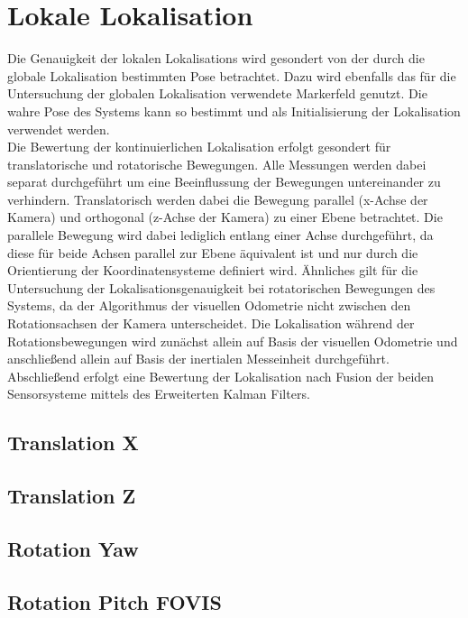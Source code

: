 \section{Lokale Lokalisation}%
Die Genauigkeit der lokalen Lokalisations wird gesondert von der durch die globale Lokalisation bestimmten Pose betrachtet. Dazu wird ebenfalls das für die Untersuchung der globalen Lokalisation verwendete Markerfeld genutzt. Die wahre Pose des Systems kann so bestimmt und als Initialisierung der Lokalisation verwendet werden.\\
Die Bewertung der kontinuierlichen Lokalisation erfolgt gesondert für translatorische und rotatorische Bewegungen. Alle Messungen werden dabei separat durchgeführt um eine Beeinflussung der Bewegungen untereinander zu verhindern. Translatorisch werden dabei die Bewegung parallel (x-Achse der Kamera) und orthogonal (z-Achse der Kamera) zu einer Ebene betrachtet. Die parallele Bewegung wird dabei lediglich entlang einer Achse durchgeführt, da diese für beide Achsen parallel zur Ebene äquivalent ist und nur durch die Orientierung der Koordinatensysteme definiert wird. Ähnliches gilt für die Untersuchung der Lokalisationsgenauigkeit bei rotatorischen Bewegungen des Systems, da der Algorithmus der visuellen Odometrie nicht zwischen den Rotationsachsen der Kamera unterscheidet. Die Lokalisation während der Rotationsbewegungen wird zunächst allein auf Basis der visuellen Odometrie und anschließend allein auf Basis der inertialen Messeinheit durchgeführt. Abschließend erfolgt eine Bewertung der Lokalisation nach Fusion der beiden Sensorsysteme mittels des Erweiterten Kalman Filters.

\subsection{Translation X}

\subsection{Translation Z}

\subsection{Rotation Yaw}

\subsection{Rotation Pitch FOVIS}

